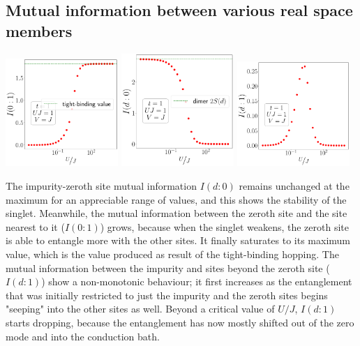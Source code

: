 \documentclass{report}
\numberwithin{equation}{section}
\begin{document}
\subsection*{Mutual information between various real space members}
\begin{center}
	\includegraphics[width=0.32\textwidth]{../figures/mi-01-t=1.000,J=1_over_U,V=J,N=6,U=0.016,91.116,32.pdf}
	\includegraphics[width=0.32\textwidth]{../figures/mi-d0-t=1.000,J=1_over_U,V=J,N=6,U=0.016,91.116,32.pdf}
	\includegraphics[width=0.32\textwidth]{../figures/mi-d1-t=1.000,J=1_over_U,V=J,N=6,U=0.016,91.116,32.pdf}
\end{center}
The impurity-zeroth site mutual information \(I(d:0)\) remains unchanged at the maximum for an appreciable range of values, and this shows the stability of the singlet. Meanwhile, the mutual information between the zeroth site and the site nearest to it (\(I(0:1)\)) grows, because when the singlet weakens, the zeroth site is able to entangle more with the other sites. It finally saturates to its maximum value, which is the value produced as result of the tight-binding hopping. The mutual information between the impurity and sites beyond the zeroth site (\(I(d:1)\)) show a non-monotonic behaviour; it first increases as the entanglement that was initially restricted to just the impurity and the zeroth sites begins "seeping" into the other sites as well. Beyond a critical value of \(U/J\), \(I(d:1)\) starts dropping, because the entanglement has now mostly shifted out of the zero mode and into the conduction bath.
\end{document}
